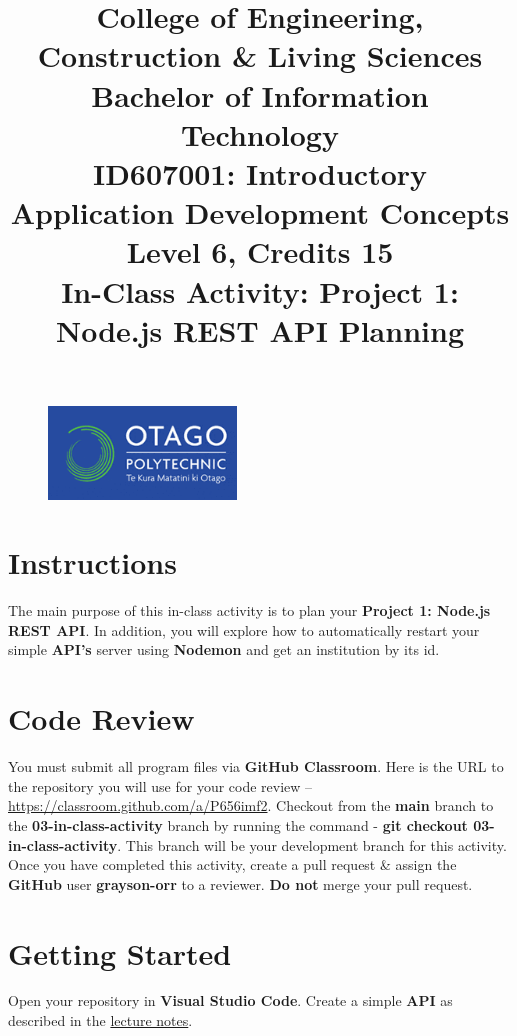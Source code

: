 \documentclass{article}
\author{}
\begin{document}
\begin{figure}
  \centering
  \includegraphics[width=50mm]{../img/logo.png}
\end{figure}

\title{College of Engineering, Construction \& Living Sciences\\Bachelor of Information Technology\\ID607001: Introductory Application Development Concepts\\Level 6, Credits 15\\\textbf{In-Class Activity: Project 1: Node.js REST API Planning}}
\date{}
\maketitle

\section*{Instructions}
The main purpose of this in-class activity is to plan your \textbf{Project 1: Node.js REST API}. In addition, you will explore how to automatically restart your simple \textbf{API's} server using \textbf{Nodemon} and get an institution by its id.

\section*{Code Review}
You must submit all program files via \textbf{GitHub Classroom}. Here is the URL to the repository you will use for your code review – \href{https://classroom.github.com/a/P656imf2}{https://classroom.github.com/a/P656imf2}. Checkout from the \textbf{main} branch to the \textbf{03-in-class-activity} branch by running the command - \textbf{git checkout 03-in-class-activity}. This branch will be your development branch for this activity. Once you have completed this activity, create a pull request \& assign the \textbf{GitHub} user \textbf{grayson-orr} to a reviewer. \textbf{Do not} merge your pull request.

\section*{Getting Started}
Open your repository in \textbf{Visual Studio Code}. Create a simple \textbf{API} as described in the \href{https://github.com/otago-polytechnic-bit-courses/ID607001-intro-app-dev-concepts/blob/master/lecture-notes/03-node-js-rest-api-1.md}{lecture notes}.
\end{document}

